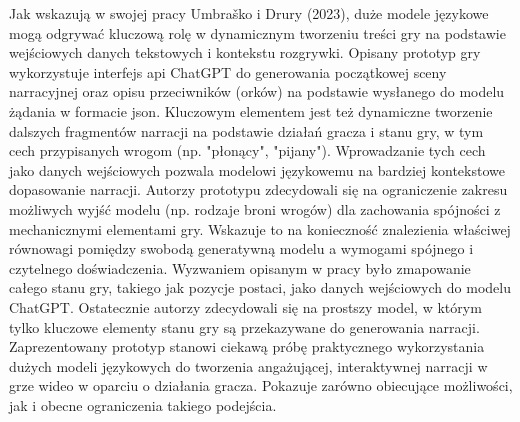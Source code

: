Jak wskazują w swojej pracy Umbraško i Drury (2023)\cite{chatgpt_narrative},
duże modele językowe mogą odgrywać kluczową rolę w
dynamicznym tworzeniu treści gry na podstawie wejściowych danych tekstowych i kontekstu rozgrywki.
Opisany prototyp gry wykorzystuje interfejs \gls{api} ChatGPT do generowania początkowej sceny narracyjnej oraz
opisu przeciwników (orków) na podstawie wysłanego do modelu żądania w formacie \gls{json}. Kluczowym
elementem jest też dynamiczne tworzenie dalszych fragmentów narracji na podstawie działań gracza i
stanu gry, w tym cech przypisanych wrogom (np. "płonący", "pijany"). Wprowadzanie tych cech jako danych
wejściowych pozwala modelowi językowemu na bardziej kontekstowe dopasowanie narracji.
Autorzy prototypu zdecydowali się na ograniczenie zakresu możliwych wyjść modelu (np. rodzaje broni
wrogów) dla zachowania spójności z mechanicznymi elementami gry. Wskazuje to na konieczność znalezienia
właściwej równowagi pomiędzy swobodą generatywną modelu a wymogami spójnego i czytelnego doświadczenia.
Wyzwaniem opisanym w pracy było zmapowanie całego stanu gry, takiego jak pozycje postaci, jako danych
wejściowych do modelu ChatGPT. Ostatecznie autorzy zdecydowali się na prostszy model, w którym tylko
kluczowe elementy stanu gry są przekazywane do generowania narracji. Zaprezentowany
prototyp stanowi ciekawą próbę praktycznego wykorzystania dużych modeli językowych do tworzenia
angażującej, interaktywnej narracji w grze wideo w oparciu o działania gracza. Pokazuje zarówno
obiecujące możliwości, jak i obecne ograniczenia takiego podejścia.\cite{chatgpt_narrative}

